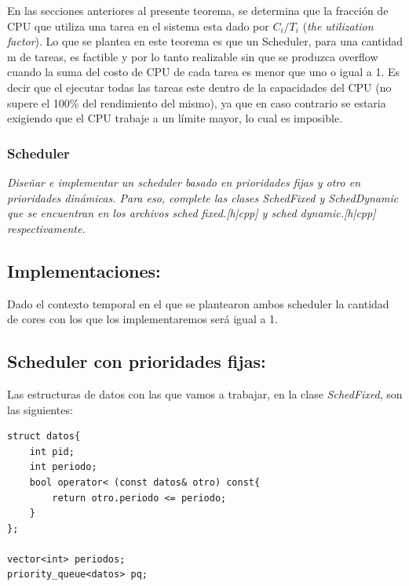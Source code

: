 \documentclass[a4paper]{article}
\begin{document}
En las secciones anteriores al presente teorema, se determina que la fracción de CPU que utiliza una tarea en el sistema esta dado por $C_i/T_i$ (\textit{the utilization factor}). Lo que se plantea en este teorema es que un Scheduler, para una cantidad m de tareas, es factible y por lo tanto realizable sin que se produzca overflow cuando la suma del costo de CPU de cada tarea es menor que uno o igual a 1. Es decir que el ejecutar todas las tareas este dentro de la capacidades del CPU (no supere el 100\% del rendimiento del mismo), ya que en caso contrario se estaria exigiendo que el CPU trabaje a un l\'imite mayor, lo cual es imposible. \\




\subsubsection{Scheduler}
\textit{Dise\~nar e implementar un scheduler basado en prioridades fijas y otro en prioridades din\'amicas. Para eso, complete las clases SchedFixed y SchedDynamic que se encuentran en los archivos sched fixed.[h|cpp] y sched dynamic.[h|cpp] respectivamente.}\\

\subsection*{Implementaciones:}

Dado el contexto temporal en el que se plantearon ambos scheduler la cantidad de cores con los que los implementaremos será igual a 1.

\subsection*{Scheduler con prioridades fijas:}

Las estructuras de datos con las que vamos a trabajar, en la clase \emph{SchedFixed}, son las siguientes:
	\begin{codesnippet}
	\begin{verbatim}
struct datos{
    int pid;
    int periodo;
    bool operator< (const datos& otro) const{
        return otro.periodo <= periodo;
    }
};
		
vector<int> periodos;
priority_queue<datos> pq;
	\end{verbatim}
	\end{codesnippet}
	
\end{document}
